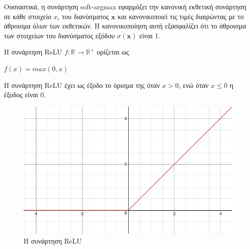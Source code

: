 Ουσιαστικά, η συνάρτηση soft-argmax εφαρμόζει την κανονική εκθετική συνάρτηση σε κάθε στοιχείο \(x_i\) του διανύσματος \(\boldsymbol{x}\) και κανονικοποιεί τις τιμές διαιρώντας με το άθροισμα όλων των εκθετικών. Η κανονικοποίηση αυτή εξασφαλίζει ότι το άθροισμα των στοιχείων του διανύσματος εξόδου \(\sigma(\boldsymbol{x})\) είναι 1.

\begin{definition}
\label{definition:relu}
Η συνάρτηση ReLU \(f: \mathbb{R} \rightarrow \mathbb{R}^+ \) ορίζεται ως

\( f(x) = max(0, x) \)

\end{definition}

H συνάρτηση ReLU έχει ως έξοδο το όρισμα της όταν \(x > 0\), ενώ όταν \(x \leq 0\) η έξοδος είναι 0.

\begin{figure}[h]
\centering
\includegraphics[scale=0.5]{images/appendix/relu_function.png}
\caption{H συνάρτηση ReLU}
\end{figure}
